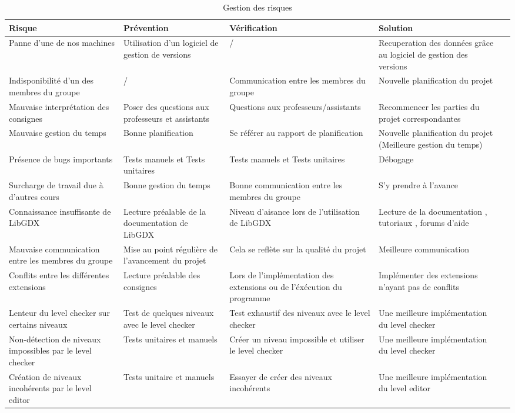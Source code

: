 \documentclass[]{article}
\begin{document}
\begin{table}[H]
\begin{center}
\begin{tabular}{|p{3cm}|p{2.5cm}||p{3cm}|p{3cm}|p{2.5cm}|}
\hline
\textbf{Risque} & Prévention & Vérification & Solution\\
\hline\hline
Panne d'une de nos machines & Utilisation d'un logiciel de gestion de versions & / &  Recuperation des données grâce au logiciel de gestion des versions\\
\hline
Indisponibilité d'un des membres du groupe & / & Communication entre les membres du groupe & Nouvelle planification du projet\\
\hline
Mauvaise interprétation des consignes & Poser des questions aux professeurs et assistants & Questions aux professeurs/assistants &  Recommencer les parties du projet correspondantes\\
\hline
Mauvaise gestion du temps & Bonne planification & Se référer au rapport de planification &  Nouvelle planification du projet (Meilleure gestion du temps)\\
\hline
Présence de bugs importants & Tests manuels et Tests unitaires & Tests manuels et Tests unitaires &  Débogage \\
\hline
Surcharge de travail due à d'autres cours & Bonne gestion du temps & Bonne communication entre les membres du groupe & S'y prendre à l'avance\\
\hline
Connaissance insuffisante de LibGDX & Lecture préalable de la documentation de LibGDX & Niveau d'aisance lors de l'utilisation de LibGDX & Lecture de la documentation , tutoriaux , forums d'aide\\
\hline
Mauvaise communication entre les membres du groupe & Mise au point régulière de l'avancement du projet & Cela se reflète sur la qualité du projet &  Meilleure communication\\
\hline
Conflits entre les différentes extensions & Lecture préalable des consignes & Lors de l'implémentation des extensions ou de l'éxécution du programme &  Implémenter des extensions n'ayant pas de conflits\\
\hline
Lenteur du level checker sur certains niveaux & Test de quelques niveaux avec le level checker & Test exhaustif des niveaux avec le level checker & Une meilleure implémentation du level checker\\
\hline
Non-détection de niveaux impossibles par le level checker & Tests unitaires et manuels & Créer un niveau impossible et utiliser le level checker & Une meilleure implémentation du level checker\\
\hline
Création de niveaux incohérents par le level editor & Tests unitaire et manuels & Essayer de créer des niveaux incohérents & Une meilleure implémentation du level editor\\
\hline


\end{tabular}
\end{center}
   \caption{Gestion des risques}
   \label{tab:risquesgeneriques}
\end{table}
\end{document}
